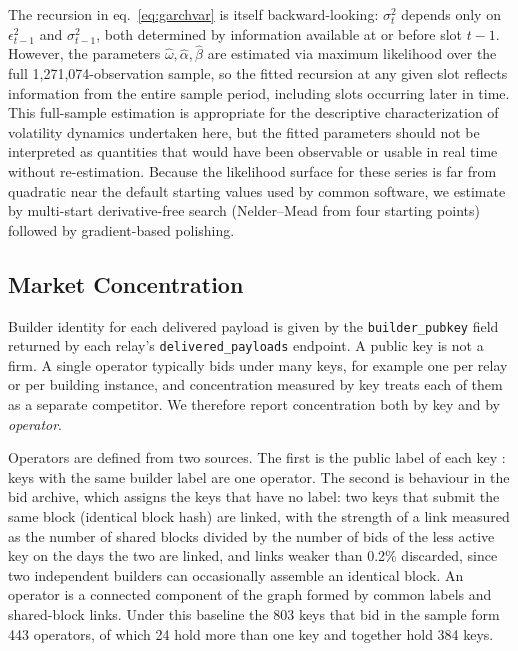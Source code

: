 \documentclass[11pt]{article}
\begin{document}
The recursion in eq.~\ref{eq:garchvar} is itself backward-looking: $\sigma_t^2$
depends only on $\epsilon_{t-1}^2$ and $\sigma_{t-1}^2$, both determined by
information available at or before slot $t-1$. However, the parameters
$\hat\omega, \hat\alpha, \hat\beta$ are estimated via maximum
likelihood over the full 1,271,074-observation sample, so the fitted recursion
at any given slot reflects information from the entire sample period, including
slots occurring later in time. This full-sample estimation is appropriate for
the descriptive characterization of volatility dynamics undertaken here, but
the fitted parameters should not be interpreted as quantities that would have
been observable or usable in real time without re-estimation. Because the
likelihood surface for these series is far from quadratic near the default
starting values used by common software, we estimate by multi-start
derivative-free search (Nelder--Mead from four starting points) followed by
gradient-based polishing.

\subsection{Market Concentration}

Builder identity for each delivered payload is given by the
\texttt{builder\_pubkey} field returned by each relay's
\texttt{delivered\_payloads} endpoint. A public key is not a firm. A single
operator typically bids under many keys, for example one per relay or per
building instance, and concentration measured by key treats each of them as
a separate competitor. We therefore report concentration both by key and by
\emph{operator}.

Operators are defined from two sources. The first is the public label of
each key \citep{dataalways2024}: keys with the same builder label are one
operator. The second is behaviour in the bid archive, which assigns the keys
that have no label: two keys that submit the same block (identical block
hash) are linked, with the strength of a link measured as the number of
shared blocks divided by the number of bids of the less active key on the
days the two are linked, and links weaker than 0.2\% discarded, since two
independent builders can occasionally assemble an identical block. An
operator is a connected component of the graph formed by common labels and
shared-block links. Under this baseline the 803 keys that bid in the sample
form 443 operators, of which 24 hold more than one key and together hold
384 keys.
\end{document}
